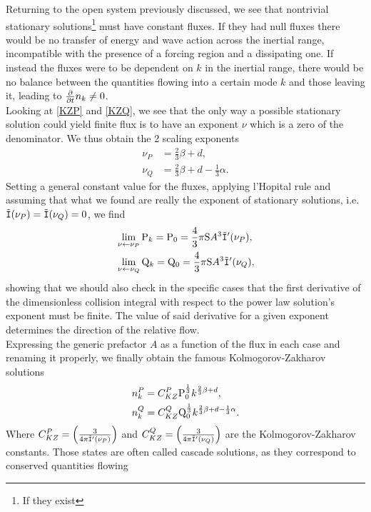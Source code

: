 Returning to the open system previously discussed, we see that nontrivial stationary solutions\footnote{If they exist} must have constant fluxes. If they had null fluxes
there would be no transfer of energy and wave action across the inertial range, incompatible with the presence of a forcing region and a dissipating one. If instead the fluxes
were to be dependent on $k$ in the inertial range, there would be no balance between the quantities flowing into a certain mode $k$ and those leaving it, leading to 
$\frac{\partial}{\partial t} n_k \neq 0$. \\
Looking at \eqref{KZP} and \eqref{KZQ}, we see that the only way a possible stationary solution could yield finite flux is to have an exponent $\nu$ which is a zero of 
the denominator. We thus obtain the 2 scaling exponents
\begin{align}
    \nu_P &= \frac{2}{3}\beta + d, \\
    \nu_Q &= \frac{2}{3}\beta + d - \frac{1}{3}\alpha.
\end{align}
Setting a general constant value for the fluxes, applying l'Hopital rule and assuming that what we found are really the exponent of stationary solutions, i.e. 
$\tilde{\mathtt{I}}(\nu_P)=\tilde{\mathtt{I}}(\nu_Q)=0$, we find 
\begin{align}
& \lim_{\nu \leftarrow \nu_P}  \mathrm{P}_k = \mathrm{P}_0 = \frac{4}{3}\pi \mathrm{S} A^3 \tilde{\mathtt{I}}'(\nu_P), \label{limP}    \\
& \lim_{\nu \leftarrow \nu_Q}  \mathrm{Q}_k = \mathrm{Q}_0 = \frac{4}{3}\pi \mathrm{S} A^3 \tilde{\mathtt{I}}'(\nu_Q), \label{limQ}
\end{align}
showing that we should also check in the specific cases that the first derivative of the dimensionless collision integral with respect to the power law solution's 
exponent must be finite. The value of said derivative for a given exponent determines the direction of the relative flow. \\
Expressing the generic prefactor $A$ as a function of the flux in each case and renaming it properly, we finally obtain the famous Kolmogorov-Zakharov solutions 
\begin{align}
    &n_k^P = C_{KZ}^P \mathrm{P}_0^{\frac{1}{3}} k^{\frac{2}{3}\beta + d}, \label{KZPsol}\\
    &n_k^Q = C_{KZ}^Q \mathrm{Q}_0^{\frac{1}{3}} k^{\frac{2}{3}\beta + d - \frac{1}{3}\alpha}. \label{KZQsol}
\end{align}
Where $C_{KZ}^P = \left(\frac{3}{4\pi\tilde{\mathtt{I}}'(\nu_P)}\right)$ and 
$C_{KZ}^Q = \left(\frac{3}{4\pi\tilde{\mathtt{I}}'(\nu_Q)}\right)$ are the Kolmogorov-Zakharov constants. Those states are often called cascade solutions, as they correspond to conserved quantities flowing
